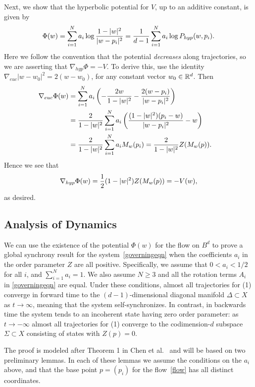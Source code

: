 \documentclass[%
 aip,
 amsmath,amssymb,
 reprint,%
]{revtex4-1}
\begin{document}
Next, we show that the hyperbolic potential for $V$, up to an additive constant, is given by
\begin{equation}
\Phi(w)   = \sum\limits_{i = 1}^N a_i \log{1 - |w|^2 \over |w - p_i|^2} ={1 \over d-1} \sum\limits_{i = 1}^N a_i \log P_{hyp}(w, p_i).\label{potential}
\end{equation}
Here we follow the convention that the potential  \emph{decreases} along trajectories, so we are asserting  that $\nabla_{hyp} \Phi = -V$.   To derive this, use the identity $\nabla_{euc} |w-w_0|^2 = 2(w-w_0)$, for any constant vector $w_0 \in {\Bbb{R}}^d$.
Then
\begin{align*}
\nabla_{euc} \Phi (w) &=  \sum\limits_{i = 1}^N a_i \left( - {2w \over 1-|w|^2} - {2(w-p_i) \over |w-p_i|^2} \right) \cr
&=   {2 \over 1-|w|^2} \sum\limits_{i = 1}^N a_i \left(    {(1-|w|^2) (p_i-w) \over |w-p_i|^2} - w \right) \cr
&= {2 \over 1-|w|^2} \sum\limits_{i = 1}^N a_i M_w(p_i) = {2 \over 1-|w|^2} Z(M_w(p)).
\end{align*}
Hence we see that 
$$
\nabla_{hyp}  \Phi  (w) = {1 \over 2} (1 - |w|^2) Z(M_w(p)) = -V(w), $$
as desired. 

\subsection{\label{sec:level2}Analysis of Dynamics}
We can use the existence of the potential $\Phi(w)$ for the flow on $B^d$ to prove a global synchrony result for the system~\eqref{governingeqn} when the coefficients $a_i$ in the order parameter $Z$ are all positive.  Specifically, we assume that  $ 0 < a_i < 1/2$ for all $i$, and $\sum_{i = 1}^N a_i = 1$.  We also assume $N \ge 3$ and all the rotation terms $A_i$ in \eqref{governingeqn} are equal.  Under these conditions, almost all trajectories for (1) converge in forward time to the $(d-1)$-dimensional diagonal manifold $\Delta \subset X$ as $t \to \infty$, meaning that the system self-synchronizes.  In contrast, in backwards time the system tends to an incoherent state having zero order parameter:  as $t \to -\infty$ almost all trajectories for (1) converge to the codimension-$d$ subspace $\Sigma \subset X$ consisting of states with $Z(p) = 0$.

The proof is modeled after Theorem 1 in Chen et al.~\cite{chen2019dynamics} and will be based on two preliminary lemmas.  In each of these lemmas we assume the conditions on the $a_i$ above, and that the base point $p = (p_i)$ for the flow~\eqref{flow} has all distinct coordinates.  
\end{document}
